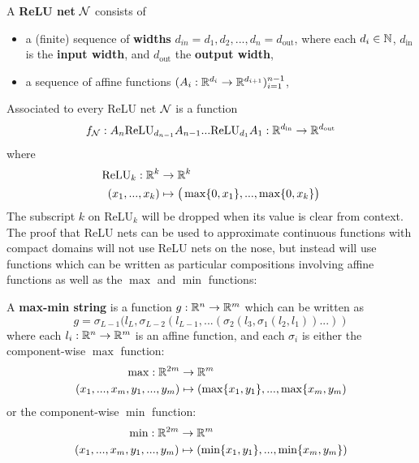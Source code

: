 \begin{defn}
A \textbf{ReLU net} $\mathcal{N}$ consists of
\begin{itemize}
    \item a (finite) sequence of \textbf{widths} $d_{in} = d_1,d_2,...,d_n = d_\text{out}$, where each $d_i \in \mathbb{N}$, $d_{\text{in}}$ is the \textbf{input width}, and $d_{\text{out}}$ the \textbf{output width},
    \item a sequence of affine functions $(A_i: \mathbb{R}^{d_i} \to \mathbb{R}^{d_{i+1}})_{i = 1}^{n-1}$,
\end{itemize}
\end{defn}
Associated to every ReLU net $\mathcal{N}$ is a function
\begin{equation}
    f_{\mathcal{N}}: A_n \text{ReLU}_{d_{n-1}} A_{n-1} ... \text{ReLU}_{d_1} A_1: \mathbb{R}^{d_{\text{in}}} \to \mathbb{R}^{d_{\text{out}}}
\end{equation}
where
\begin{align*}
    \text{ReLU}_k: \mathbb{R}^{k} &\to \mathbb{R}^k\\
    (x_1,...,x_k) &\mapsto \big(\operatorname{max}\lbrace 0,x_1\rbrace,...,\operatorname{max}\lbrace 0, x_k \rbrace\big)
\end{align*}
The subscript $k$ on ReLU$_k$ will be dropped when its value is clear from context.
The proof that ReLU nets can be used to approximate continuous functions with compact domains will not use ReLU nets on the nose, but instead will use functions which can be written as particular compositions involving affine functions as well as the $\operatorname{max}$ and $\operatorname{min}$ functions:
\begin{defn}
A \textbf{max-min string} is a function $g: \mathbb{R}^n \to \mathbb{R}^m$ which can be written as
\begin{equation}
    g = \sigma_{L-1}(l_L,\sigma_{L-2}(l_{L-1},...(\sigma_2(l_3,\sigma_1(l_2,l_1))...))
\end{equation}
where each $l_i: \mathbb{R}^n \to \mathbb{R}^m$ is an affine function, and each $\sigma_i$ is either the component-wise $\operatorname{max}$ function:
\begin{align*}
    \operatorname{max}: \mathbb{R}^{2m} &\to \mathbb{R}^m\\
    (x_1,...,x_m,y_1,...,y_m) &\mapsto (\operatorname{max}\lbrace x_1,y_1\rbrace,...,\operatorname{max}\lbrace x_m,y_m)
\end{align*}
or the component-wise $\operatorname{min}$ function:
\begin{align*}
    \operatorname{min}: \mathbb{R}^{2m} &\to \mathbb{R}^m\\
    (x_1,...,x_m,y_1,...,y_m) &\mapsto (\operatorname{min}\lbrace x_1,y_1\rbrace,...,\operatorname{min}\lbrace x_m,y_m\rbrace)
\end{align*}
\end{defn}
